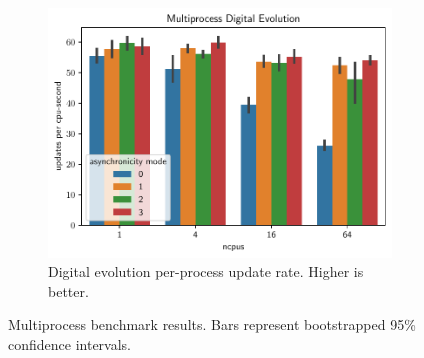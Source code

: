 \begin{figure}[thpb]
  \begin{subfigure}[b]{0.49\textwidth}
    \centering
  \includegraphics[width=\linewidth]{chart/multiprocess-digital-evolution}
  \caption{Digital evolution per-process update rate. Higher is better.}
  \label{fig:multiprocess_digital_evolution_update_rate}
  \end{subfigure}

  \caption{Multiprocess benchmark results. Bars represent bootstrapped 95\% confidence intervals. }
  \label{fig:multiprocess_benchmarks}
\end{figure}
